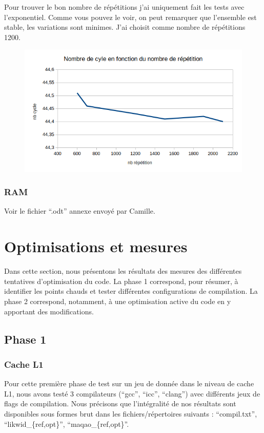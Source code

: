\documentclass[12pt,a4paper]{article}
\begin{document}
Pour trouver le bon nombre de répétitions j'ai uniquement fait les tests avec
l'exponentiel. Comme vous pouvez le voir, on peut remarquer que l'ensemble est
stable, les variations sont minimes. J'ai choisit comme nombre de répétitions
1200.
\begin{figure}[h]
    \includegraphics[scale=0.8]{figures/L2/L2repet.png}
    \caption{ }
\end{figure}

\subsubsection{RAM}

Voir le fichier \enquote{.odt} annexe envoyé par Camille.

\section{Optimisations et mesures}

Dans cette section, nous présentons les résultats des mesures des différentes
tentatives d'optimisation du code. La phase 1 correspond, pour résumer, à
identifier les points chauds et tester différentes configurations de compilation.
La phase 2 correspond, notamment, à une optimisation active du code en y apportant
des modifications.

\subsection{Phase 1}

\subsubsection{Cache L1}

Pour cette première phase de test sur un jeu de donnée dans le niveau de cache
L1, nous avons testé 3 compilateurs (\enquote{gcc}, \enquote{icc},
\enquote{clang}) avec différents jeux de flags de compilation. Nous précisons que
l'intégralité de nos résultats sont disponibles sous formes brut dans les
fichiers/répertoires suivants : \enquote{compil.txt},
\enquote{likwid\_\{ref,opt\}}, \enquote{maqao\_\{ref,opt\}}.
\end{document}
